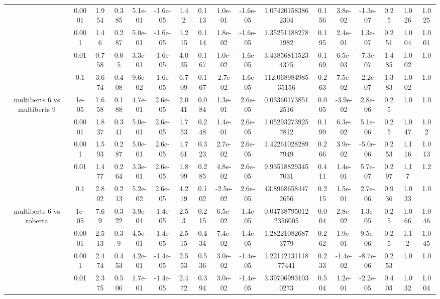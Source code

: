 \begin{tabular}{|c|c|c|c|c|c|c|c|c|c|c|c|c|c|c|c|c|}
 & 0.0001 & 1.954 & 0.385 & 5.1e-01 & -1.6e-05 & 1.42 & 0.113 & 1.0e-01 & -1.6e-05 & 1.074201583862304 & 0.156 & 3.8e-02 & -1.3e-07 & 0.25 & 1.026 & 1.025 \\
 & 0.001 & 1.46 & 0.287 & 5.0e-01 & -1.6e-05 & 1.215 & 0.114 & 1.8e-02 & -1.6e-05 & 1.352511882781982 & 0.195 & 2.4e-01 & 1.3e-07 & 0.251 & 1.004 & 1.001 \\
 & 0.01 & 0.758 & 0.05 & 3.3e-01 & -1.6e-05 & 4.035 & 0.167 & 1.0e-02 & -1.6e-05 & 3.438568115234375 & 0.169 & 6.5e-03 & -7.3e-07 & 1.485 & 1.002 & 1.0 \\
 & 0.1 & 3.674 & 0.408 & 9.6e-02 & -1.6e-05 & 6.709 & 0.167 & -2.7e-02 & -1.6e-05 & 112.06898498535156 & 0.263 & 7.5e-02 & -2.2e-07 & 1.383 & 1.002 & 1.0 \\
\hline
\multirow{5}{*}{multiberts 6 vs multiberts 9} & 1e-05 & 7.658 & 0.188 & 4.7e-01 & 2.6e-05 & 2.041 & 0.084 & 1.3e-01 & 2.6e-05 & 0.033601738512516 & 0.005 & -3.9e-02 & 2.8e-06 & 0.25 & 1.0 & 1.0 \\
 & 0.0001 & 1.837 & 0.341 & 5.0e-01 & 2.6e-05 & 1.753 & 0.248 & 1.4e-01 & 2.6e-05 & 1.052932739257812 & 0.199 & 6.3e-02 & 5.1e-06 & 0.25 & 1.047 & 1.02 \\
 & 0.001 & 1.593 & 0.287 & 5.0e-01 & 2.6e-05 & 1.761 & 0.323 & 2.7e-02 & 2.6e-05 & 1.422610282897949 & 0.266 & 3.9e-02 & -5.0e-06 & 0.253 & 1.116 & 1.013 \\
 & 0.01 & 1.477 & 0.264 & 3.3e-01 & 2.6e-05 & 1.899 & 0.285 & 4.8e-02 & 2.6e-05 & 9.935188293457031 & 0.411 & 1.4e-01 & 5.7e-07 & 0.297 & 1.17 & 1.2 \\
 & 0.1 & 2.802 & 0.213 & 5.2e-02 & 2.6e-05 & 4.219 & 0.102 & -2.5e-02 & 2.6e-05 & 43.89686584472656 & 0.215 & 1.5e-01 & 2.7e-06 & 0.936 & 1.033 & 1.0 \\
\hline
\multirow{5}{*}{multiberts 6 vs roberta } & 1e-05 & 7.69 & 0.322 & 3.9e-01 & -1.4e-05 & 2.53 & 0.215 & 6.5e-02 & -1.4e-05 & 0.047387950122356005 & 0.004 & 2.8e-02 & 1.3e-05 & 0.25 & 1.066 & 1.046 \\
 & 0.0001 & 2.513 & 0.39 & 4.5e-01 & -1.4e-05 & 2.515 & 0.434 & 7.4e-02 & -1.4e-05 & 1.282210826873779 & 0.262 & 1.9e-01 & 9.5e-06 & 0.25 & 1.12 & 1.045 \\
 & 0.001 & 2.474 & 0.453 & 4.2e-01 & -1.4e-05 & 2.553 & 0.536 & 3.0e-02 & -1.4e-05 & 1.2211213111877441 & 0.233 & -1.4e-02 & -8.7e-06 & 0.253 & 1.0 & 1.0 \\
 & 0.01 & 2.375 & 0.506 & 1.7e-01 & -1.4e-05 & 2.472 & 0.394 & 3.0e-02 & -1.4e-05 & 3.397069931030273 & 0.504 & 1.2e-01 & -2.2e-05 & 0.403 & 1.032 & 1.004 \\

\end{tabular}
